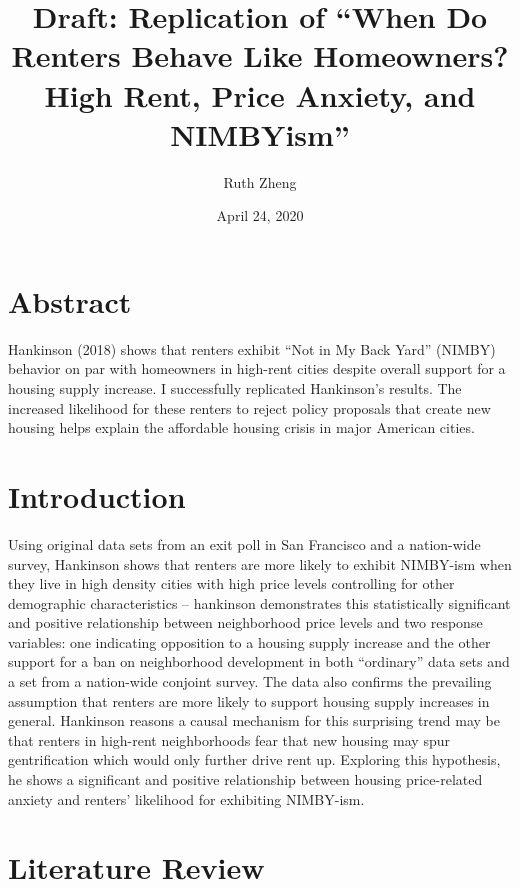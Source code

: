 \documentclass[]{article}
\title{Draft: Replication of ``When Do Renters Behave Like Homeowners? High Rent, Price Anxiety, and NIMBYism''}
\author{Ruth Zheng}
\date{April 24, 2020}
\begin{document}
\maketitle

\hypertarget{abstract}{%
\section{Abstract}\label{abstract}}

Hankinson (2018) shows that renters exhibit ``Not in My Back Yard'' (NIMBY) behavior on par with homeowners in high-rent cities despite overall support for a housing supply increase. I successfully replicated Hankinson's results. The increased likelihood for these renters to reject policy proposals that create new housing helps explain the affordable housing crisis in major American cities.

\hypertarget{introduction}{%
\section{Introduction}\label{introduction}}

Using original data sets from an exit poll in San Francisco and a nation-wide survey, Hankinson shows that renters are more likely to exhibit NIMBY-ism when they live in high density cities with high price levels controlling for other demographic characteristics -- hankinson demonstrates this statistically significant and positive relationship between neighborhood price levels and two response variables: one indicating opposition to a housing supply increase and the other support for a ban on neighborhood development in both ``ordinary'' data sets and a set from a nation-wide conjoint survey. The data also confirms the prevailing assumption that renters are more likely to support housing supply increases in general. Hankinson reasons a causal mechanism for this surprising trend may be that renters in high-rent neighborhoods fear that new housing may spur gentrification which would only further drive rent up. Exploring this hypothesis, he shows a significant and positive relationship between housing price-related anxiety and renters' likelihood for exhibiting NIMBY-ism.

\hypertarget{literature-review}{%
\section{Literature Review}\label{literature-review}}
\end{document}
